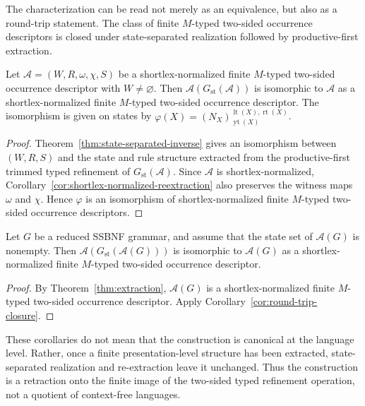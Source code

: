 \documentclass[sub]{jalc}
\newcommand{\yt}{\operatorname{yt}}
\newcommand{\lt}{\operatorname{lt}}
\newcommand{\rt}{\operatorname{rt}}
\begin{document}
The characterization can be read not merely as an equivalence, but also as a round-trip statement. The class of finite \(M\)-typed two-sided occurrence descriptors is closed under state-separated realization followed by productive-first extraction.

\begin{corollary}
\label{cor:round-trip-closure}
Let \(\mathcal A=(W,R,\omega,\chi,S)\) be a shortlex-normalized finite \(M\)-typed two-sided occurrence descriptor with \(W\neq\varnothing\). Then \(\mathcal A(G_{\mathrm{st}}(\mathcal A))\) is isomorphic to \(\mathcal A\) as a shortlex-normalized finite \(M\)-typed two-sided occurrence descriptor. The isomorphism is given on states by \(\varphi(X)=(N_X)_{\yt(X)}^{\lt(X),\rt(X)}\).
\end{corollary}

\begin{proof}
Theorem~\ref{thm:state-separated-inverse} gives an isomorphism between \((W,R,S)\) and the state and rule structure extracted from the productive-first trimmed typed refinement of \(G_{\mathrm{st}}(\mathcal A)\). Since \(\mathcal A\) is shortlex-normalized, Corollary~\ref{cor:shortlex-normalized-reextraction} also preserves the witness maps \(\omega\) and \(\chi\). Hence \(\varphi\) is an isomorphism of shortlex-normalized finite \(M\)-typed two-sided occurrence descriptors.
\end{proof}

\begin{corollary}
\label{cor:idempotence-extracted-structures}
Let \(G\) be a reduced SSBNF grammar, and assume that the state set of \(\mathcal A(G)\) is nonempty. Then \(\mathcal A(G_{\mathrm{st}}(\mathcal A(G)))\) is isomorphic to \(\mathcal A(G)\) as a shortlex-normalized finite \(M\)-typed two-sided occurrence descriptor.
\end{corollary}

\begin{proof}
By Theorem~\ref{thm:extraction}, \(\mathcal A(G)\) is a shortlex-normalized finite \(M\)-typed two-sided occurrence descriptor. Apply Corollary~\ref{cor:round-trip-closure}.
\end{proof}

These corollaries do not mean that the construction is canonical at the language level. Rather, once a finite presentation-level structure has been extracted, state-separated realization and re-extraction leave it unchanged. Thus the construction is a retraction onto the finite image of the two-sided typed refinement operation, not a quotient of context-free languages.
\end{document}
